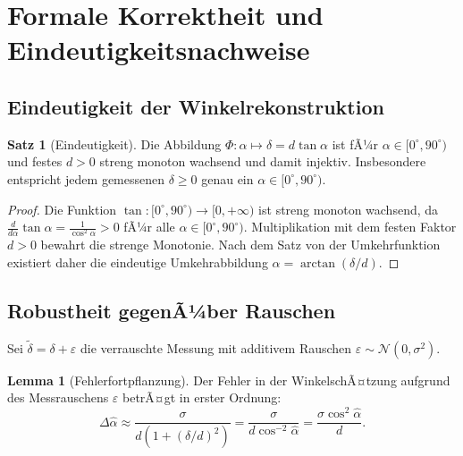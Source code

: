 ﻿\documentclass[a4paper,12pt]{article}
\theoremstyle{definition}
\newtheorem{satz}{Satz}
\newtheorem{lemma}{Lemma}
\begin{document}
\section{Formale Korrektheit und Eindeutigkeitsnachweise}

\subsection{Eindeutigkeit der Winkelrekonstruktion}

\begin{satz}[Eindeutigkeit]
  \label{satz:eindeutigkeit}
  Die Abbildung $\Phi: \alpha \mapsto \delta = d\tan\alpha$ ist fÃ¼r
  $\alpha \in [0^\circ, 90^\circ)$ und festes $d > 0$ streng monoton wachsend und damit
  injektiv. Insbesondere entspricht jedem gemessenen $\delta \geq 0$ genau ein
  $\alpha \in [0^\circ, 90^\circ)$.
\end{satz}

\begin{proof}
  Die Funktion $\tan: [0^\circ, 90^\circ) \to [0, +\infty)$ ist streng monoton wachsend,
  da $\frac{d}{d\alpha}\tan\alpha = \frac{1}{\cos^2\alpha} > 0$ fÃ¼r alle
  $\alpha \in [0^\circ, 90^\circ)$. Multiplikation mit dem festen Faktor $d > 0$ bewahrt
  die strenge Monotonie. Nach dem Satz von der Umkehrfunktion existiert daher
  die eindeutige Umkehrabbildung $\alpha = \arctan(\delta/d)$. \qedhere
\end{proof}

\subsection{Robustheit gegenÃ¼ber Rauschen}

Sei $\tilde{\delta} = \delta + \varepsilon$ die verrauschte Messung mit
additivem Rauschen $\varepsilon \sim \mathcal{N}(0, \sigma^2)$.

\begin{lemma}[Fehlerfortpflanzung]
  \label{lem:fehler}
  Der Fehler in der WinkelschÃ¤tzung aufgrund des Messrauschens $\varepsilon$
  betrÃ¤gt in erster Ordnung:
  \[
    \Delta\hat{\alpha} \approx \frac{\sigma}{d(1 + (\delta/d)^2)}
    = \frac{\sigma}{d\cos^{-2}\hat{\alpha}}
    = \frac{\sigma \cos^2\hat{\alpha}}{d}.
  \]
\end{lemma}
\end{document}
